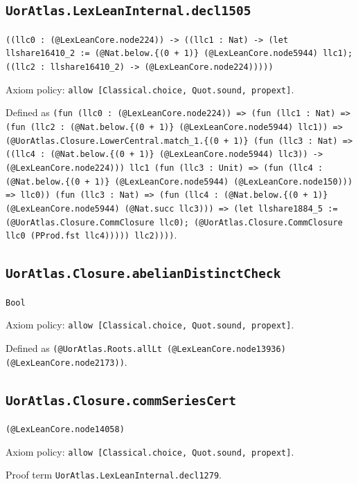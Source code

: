 \documentclass[11pt]{article}
\begin{document}
\subsection*{\texttt{UorAtlas.LexLeanInternal.decl1505}}
\noindent\texttt{((llc0 : (@LexLeanCore.node224)) -> ((llc1 : Nat) -> (let llshare16410\_2 := (@Nat.below.\{(0 + 1)\} (@LexLeanCore.node5944) llc1); ((llc2 : llshare16410\_2) -> (@LexLeanCore.node224)))))}\par
\noindent Axiom policy: \texttt{allow [Classical.choice, Quot.sound, propext]}.\par
\noindent Defined as \texttt{(fun (llc0 : (@LexLeanCore.node224)) => (fun (llc1 : Nat) => (fun (llc2 : (@Nat.below.\{(0 + 1)\} (@LexLeanCore.node5944) llc1)) => (@UorAtlas.Closure.LowerCentral.match\_1.\{(0 + 1)\} (fun (llc3 : Nat) => ((llc4 : (@Nat.below.\{(0 + 1)\} (@LexLeanCore.node5944) llc3)) -> (@LexLeanCore.node224))) llc1 (fun (llc3 : Unit) => (fun (llc4 : (@Nat.below.\{(0 + 1)\} (@LexLeanCore.node5944) (@LexLeanCore.node150))) => llc0)) (fun (llc3 : Nat) => (fun (llc4 : (@Nat.below.\{(0 + 1)\} (@LexLeanCore.node5944) (@Nat.succ llc3))) => (let llshare1884\_5 := (@UorAtlas.Closure.CommClosure llc0); (@UorAtlas.Closure.CommClosure llc0 (PProd.fst llc4))))) llc2))))}.\par
\subsection*{\texttt{UorAtlas.Closure.abelianDistinctCheck}}
\noindent\texttt{Bool}\par
\noindent Axiom policy: \texttt{allow [Classical.choice, Quot.sound, propext]}.\par
\noindent Defined as \texttt{(@UorAtlas.Roots.allLt (@LexLeanCore.node13936) (@LexLeanCore.node2173))}.\par
\subsection*{\texttt{UorAtlas.Closure.commSeriesCert}}
\noindent\texttt{(@LexLeanCore.node14058)}\par
\noindent Axiom policy: \texttt{allow [Classical.choice, Quot.sound, propext]}.\par
\noindent Proof term \texttt{UorAtlas.LexLeanInternal.decl1279}.\par
\end{document}
